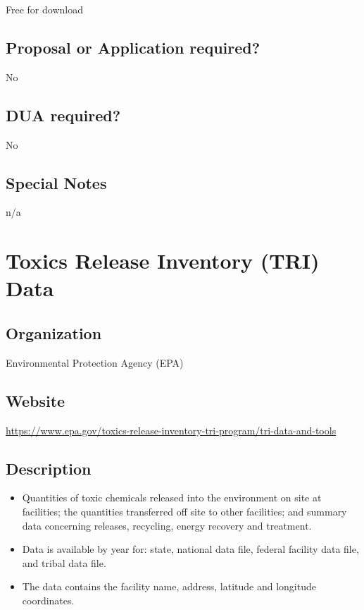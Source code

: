 \documentclass[
]{book}
\providecommand{\tightlist}{%
  \setlength{\itemsep}{0pt}\setlength{\parskip}{0pt}}
\begin{document}
Free for download

\hypertarget{proposal-or-application-required-88}{%
\section{Proposal or Application required?}\label{proposal-or-application-required-88}}

No

\hypertarget{dua-required-88}{%
\section{DUA required?}\label{dua-required-88}}

No

\hypertarget{special-notes-88}{%
\section{Special Notes}\label{special-notes-88}}

n/a

\mainmatter

\hypertarget{toxics-release-inventory-tri-data}{%
\chapter{Toxics Release Inventory (TRI) Data}\label{toxics-release-inventory-tri-data}}

\hypertarget{organization-89}{%
\section{Organization}\label{organization-89}}

Environmental Protection Agency (EPA)

\hypertarget{website-89}{%
\section{Website}\label{website-89}}

\url{https://www.epa.gov/toxics-release-inventory-tri-program/tri-data-and-tools}

\hypertarget{description-89}{%
\section{Description}\label{description-89}}

\begin{itemize}
\tightlist
\item
  Quantities of toxic chemicals released into the environment on site at facilities; the quantities transferred off site to other facilities; and summary data concerning releases, recycling, energy recovery and treatment.
\item
  Data is available by year for: state, national data file, federal facility data file, and tribal data file.
\item
  The data contains the facility name, address, latitude and longitude coordinates.
\end{itemize}
\end{document}
